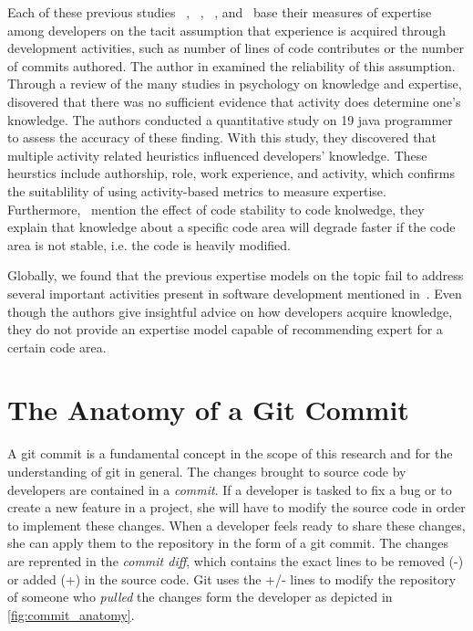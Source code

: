 Each of these previous studies ~\citep{Bhattacharya}, ~\citep{mockus02}, ~\citep{McDonald}, and~\citep{Fritz-2007} base their measures of expertise among developers on the tacit assumption that experience is acquired through development activities, such as number of lines of code contributes or the number of commits authored. The author in \citep{Fritz-2007} examined the reliability of this assumption. Through a review of the many studies in psychology on knowledge and expertise, \citep{Fritz-2007} disovered that there was no sufficient evidence that activity does determine one's knowledge. The authors conducted a quantitative study on 19 java programmer to assess the accuracy of these finding. With this study, they discovered that multiple activity related heuristics influenced developers' knowledge. These heurstics include authorship, role, work experience, and activity, which confirms the suitablility of using activity-based metrics to measure expertise. Furthermore,~\citep{Fritz-2007} mention the effect of code stability to code knolwedge, they explain that knowledge about a specific code area will degrade faster if the code area is not stable, i.e. the code is heavily modified. 

Globally, we found that the previous expertise models on the topic fail to address several important activities present in software development mentioned in~\citep{Fritz-2007}. Even though the authors give insightful advice on how developers acquire knowledge, they do not provide an expertise model capable of recommending expert for a certain code area. 

\section{The Anatomy of a Git Commit}
\label{sec:commit_anatomy}

A git commit is a fundamental concept in the scope of this research and for the understanding of git in general. The changes brought to source code by developers are contained in a \textit{commit}. If a developer is tasked to fix a bug or to create a new feature in a project, she will have to modify the source code in order to implement these changes. When a developer feels ready to share these changes, she can apply them to the repository in the form of a git commit. The changes are reprented in the \textit{commit diff}, which contains the exact lines to be removed (-) or added (+) in the source code. Git uses the +/- lines to modify the repository of someone who \textit{pulled} the changes form the developer as depicted in \autoref{fig:commit_anatomy}. 

